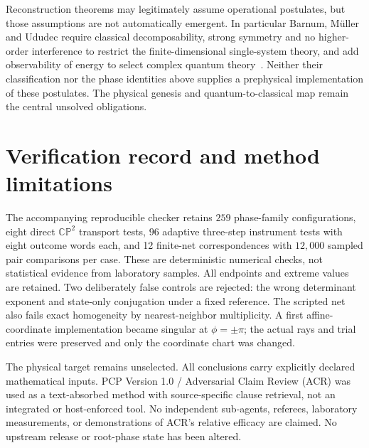 \documentclass[11pt,a4paper]{article}
\newcommand{\CP}{\mathbb{CP}}
\begin{document}
Reconstruction theorems may legitimately assume operational postulates, but those assumptions are not automatically emergent. In particular Barnum, M\"uller and Ududec require classical decomposability, strong symmetry and no higher-order interference to restrict the finite-dimensional single-system theory, and add observability of energy to select complex quantum theory~\cite{barnum}. Neither their classification nor the phase identities above supplies a prephysical implementation of these postulates. The physical genesis and quantum-to-classical map remain the central unsolved obligations.

\section{Verification record and method limitations}
The accompanying reproducible checker retains $259$ phase-family configurations, eight direct $\CP^2$ transport tests, $96$ adaptive three-step instrument tests with eight outcome words each, and 12 finite-net correspondences with $12{,}000$ sampled pair comparisons per case. These are deterministic numerical checks, not statistical evidence from laboratory samples. All endpoints and extreme values are retained. Two deliberately false controls are rejected: the wrong determinant exponent and state-only conjugation under a fixed reference. The scripted net also fails exact homogeneity by nearest-neighbor multiplicity. A first affine-coordinate implementation became singular at $\phi=\pm\pi$; the actual rays and trial entries were preserved and only the coordinate chart was changed.

The physical target remains unselected. All conclusions carry explicitly declared mathematical inputs. PCP Version 1.0 / Adversarial Claim Review (ACR) was used as a text-absorbed method with source-specific clause retrieval, not an integrated or host-enforced tool. No independent sub-agents, referees, laboratory measurements, or demonstrations of ACR's relative efficacy are claimed. No upstream release or root-phase state has been altered.
\end{document}
